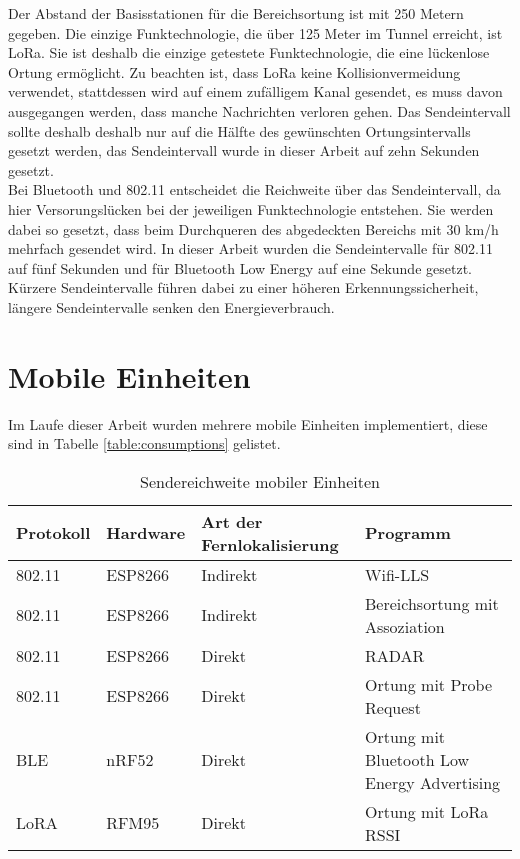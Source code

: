 Der Abstand der Basisstationen für die Bereichsortung ist mit 250 Metern gegeben. 
Die einzige Funktechnologie, die über 125 Meter im Tunnel erreicht, ist LoRa.
Sie ist deshalb die einzige getestete Funktechnologie, die eine lückenlose Ortung ermöglicht.
Zu beachten ist, dass LoRa keine Kollisionvermeidung verwendet, stattdessen wird auf einem zufälligem Kanal gesendet, es muss davon ausgegangen werden, dass manche Nachrichten verloren gehen.
Das Sendeintervall sollte deshalb deshalb nur auf die Hälfte des gewünschten Ortungsintervalls gesetzt werden, das Sendeintervall wurde in dieser Arbeit auf zehn Sekunden gesetzt.\\
Bei Bluetooth und 802.11 entscheidet die Reichweite über das Sendeintervall, da hier Versorungslücken bei der jeweiligen Funktechnologie entstehen.
Sie werden dabei so gesetzt, dass beim Durchqueren des abgedeckten Bereichs mit 30 km/h mehrfach gesendet wird.
In dieser Arbeit wurden die Sendeintervalle für 802.11 auf fünf Sekunden und für Bluetooth Low Energy auf eine Sekunde gesetzt.\\
Kürzere Sendeintervalle führen dabei zu einer höheren Erkennungssicherheit, längere Sendeintervalle senken den Energieverbrauch.

\section{Mobile Einheiten}
Im Laufe dieser Arbeit wurden mehrere mobile Einheiten implementiert, diese sind in Tabelle \ref{table:consumptions} gelistet.

\begin{table}[h]
	\centering
	\caption{Sendereichweite mobiler Einheiten}
	\label{table:ranges}
	\begin{tabular}{p{2cm}|p{2.5cm}|p{2.5cm}|p{5.8cm}}
		Protokoll & Hardware & Art der Fernlokalisierung & Programm \\
		\hline
		802.11 & ESP8266 & Indirekt & Wifi-LLS \cite{chen2007design} \\
		802.11 & ESP8266 & Indirekt & Bereichsortung mit Assoziation \\
		\hline
		802.11 & ESP8266 & Direkt & RADAR \cite{bahl2000radar} \\
		802.11 & ESP8266 & Direkt & Ortung mit Probe Request \\
		\hline
		BLE & nRF52 & Direkt & Ortung mit Bluetooth Low Energy Advertising \cite{jianyong2014rssi} \\
		\hline
		LoRA & RFM95 & Direkt & Ortung mit LoRa RSSI \cite{kim2016poster} \\
	\end{tabular}
\end{table}

